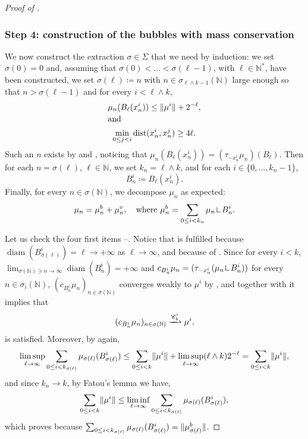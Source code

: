\documentclass[10pt]{amsart}
\theoremstyle{plain}
\theoremstyle{definition}
\newcommand{\N}{\mathbb{N}}
\newcommand{\Cspace}{\mathscr{C}}
\newcommand{\mres}{\mathop{\hbox{\vrule height 6pt width .5pt depth 0pt \vrule height .5pt width 4pt depth 0pt}}\nolimits}
\DeclarePairedDelimiter{\norm}{\lVert}{\rVert}
\DeclareMathOperator{\diam}{diam}
\DeclareMathOperator{\dist}{dist}
\newcommand{\narrowto}{\xrightharpoonup{\Cspace_b'}}
\begin{document}
\begin{proof}[Proof of ]
\subsubsection*{Step 4: construction of the bubbles with mass conservation}
We now construct the extraction \(\sigma\in\Sigma\) that we need by induction: we set \(\sigma(0)=0\) and, assuming that \(\sigma(0)<\dots<\sigma(\ell-1)\), with \(\ell\in\N^\ast\), have been constructed, we set \(\sigma(\ell)\coloneqq n\) with \(n\in\sigma_{\ell \wedge k -1}(\N)\) large enough so that $n > \sigma(\ell-1)$ and for every \(i< \ell \wedge k\),\vspace*{-3pt}
\begin{gather}
\mu_n(B_\ell(x^i_n))\le\norm{\mu^i}+2^{-\ell},\label{inductionBubbles1}\\[-3pt]
\shortintertext{and}
\min_{0\le j<i}\dist(x^i_n,x^j_n)\ge 4\ell.\label{inductionBubbles2}
\end{gather}
Such an \(n\) exists by  and , noticing that $\mu_n(B_\ell(x_n^i)) = (\tau_{-x_n^i} \mu_n)(B_\ell)$. Then for each \(n=\sigma(\ell)\), \(\ell\in\N\), we set \(k_n=\ell \wedge k\), and for each \(i\in\{0,\dots,k_n-1\}\),\vspace*{-3pt}
\[
B^i_n\coloneqq B_\ell(x^i_n).
\]
Finally, for every \(n\in\sigma(\N)\), we decompose $\mu_n$ as expected:\vspace*{-3pt}
\[
\mu_n = \mu^b_n + \mu^v_n,\quad \text{where } \mu^b_n = \sum_{0\le i < k_n} \mu_n \mres B_n^i.
\]

Let us check the four first items --. Notice that  is fulfilled because $\diam(B_{\sigma(\ell)}^i) = \ell \to +\infty$ as $\ell\to\infty$, and  because of . Since for every $i<k$, $\lim_{\sigma(\N)\ni n \to\infty}\diam(B_n^i) = +\infty$ and $c_{B_n^i} \mu_n = (\tau_{-x_n^i} (\mu_n\mres B_n^i))$ for every $n \in \sigma_i(\N)$, $(c_{B_n^i} \mu_n)_{n\in\sigma(\N)}$ converges weakly to $\mu^i$ by , and together with  it implies that\vspace*{-3pt}
\[(c_{B_n^i} \mu_n)_{n\in\sigma(\N)} \narrowto \mu^i,\]
\ie {} is satisfied.
Moreover, by  again,\vspace*{-3pt}
\[
\limsup_{\ell\to\infty}\sum_{0\le i<k_{\sigma(\ell)}}\mu_{\sigma(\ell)}(B^i_{\sigma(\ell)})\le \sum_{0\le i<k}\norm{\mu^i}+\limsup_{\ell\to\infty}(\ell \wedge k) 2^{-\ell}=\sum_{0\le i<k}\norm{\mu^i},
\]
and since $k_n \to k$, by Fatou's lemma we have,\vspace*{-3pt}
\[\sum_{0\leq i < k}\norm{\mu^i} \leq \liminf_{\ell\to\infty}\sum_{0\le i<k_{\sigma(\ell)}}\mu_{\sigma(\ell)}(B^i_{\sigma(\ell)}),\]
which proves  because $ \sum_{0\le i<k_{\sigma(\ell)}}\mu_{\sigma(\ell)}(B^i_{\sigma(\ell)}) = \norm{\mu^b_{\sigma(\ell)}}$.


\end{proof}
\end{document}
